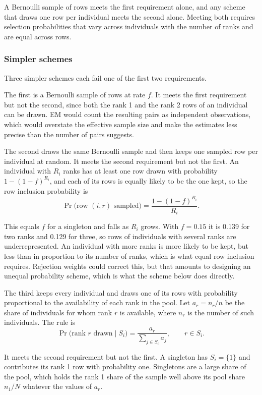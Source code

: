 \documentclass[11pt]{article}
\begin{document}
A Bernoulli sample of rows meets the first requirement alone, and any scheme that draws one row per individual meets the second alone. Meeting both requires selection probabilities that vary across individuals with the number of ranks and are equal across rows.

\subsubsection*{Simpler schemes}

Three simpler schemes each fail one of the first two requirements.

The first is a Bernoulli sample of rows at rate $f$. It meets the first requirement but not the second, since both the rank 1 and the rank 2 rows of an individual can be drawn. EM would count the resulting pairs as independent observations, which would overstate the effective sample size and make the estimates less precise than the number of pairs suggests.

The second draws the same Bernoulli sample and then keeps one sampled row per individual at random. It meets the second requirement but not the first. An individual with $R_i$ ranks has at least one row drawn with probability $1 - (1 - f)^{R_i}$, and each of its rows is equally likely to be the one kept, so the row inclusion probability is
\[
\Pr\big(\text{row } (i, r) \text{ sampled}\big) = \frac{1 - (1 - f)^{R_i}}{R_i}.
\]

This equals $f$ for a singleton and falls as $R_i$ grows. With $f = 0.15$ it is 0.139 for two ranks and 0.129 for three, so rows of individuals with several ranks are underrepresented. An individual with more ranks is more likely to be kept, but less than in proportion to its number of ranks, which is what equal row inclusion requires. Rejection weights could correct this, but that amounts to designing an unequal probability scheme, which is what the scheme below does directly.

The third keeps every individual and draws one of its rows with probability proportional to the availability of each rank in the pool. Let $a_r = n_r / n$ be the share of individuals for whom rank $r$ is available, where $n_r$ is the number of such individuals. The rule is
\[
\Pr\big(\text{rank } r \text{ drawn} \mid S_i\big) = \frac{a_r}{\sum_{j \in S_i} a_j}, \qquad r \in S_i.
\]

It meets the second requirement but not the first. A singleton has $S_i = \{1\}$ and contributes its rank 1 row with probability one. Singletons are a large share of the pool, which holds the rank 1 share of the sample well above its pool share $n_1 / N$ whatever the values of $a_r$.
\end{document}
